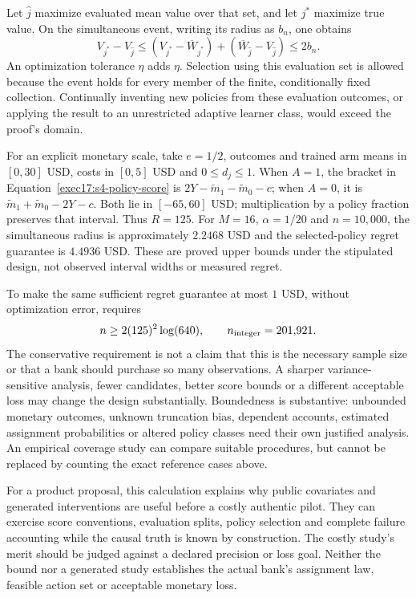 Let $\widehat j$ maximize evaluated mean value over that set, and let
$j^*$ maximize true value. On the simultaneous event, writing its radius
as $b_n$, one obtains
\[
 V_{j^*}-V_{\widehat j}
 \leq (V_{j^*}-\overline W_{j^*})
      +(\overline W_{\widehat j}-V_{\widehat j})\leq2b_n.
\]
An optimization tolerance $\eta$ adds $\eta$. Selection using this evaluation
set is allowed because the event holds for every member of the finite,
conditionally fixed collection. Continually inventing new policies from
these evaluation outcomes, or applying the result to an unrestricted
adaptive learner class, would exceed the proof's domain.

For an explicit monetary scale, take $e=1/2$, outcomes and trained arm
means in $[0,30]$ USD, costs in $[0,5]$ USD and $0\leq d_j\leq1$.
When $A=1$, the bracket in Equation~\eqref{exec17:s4-policy-score} is
$2Y-\widetilde m_1-\widetilde m_0-c$; when $A=0$, it is
$\widetilde m_1+\widetilde m_0-2Y-c$. Both lie in $[-65,60]$ USD;
multiplication by a policy fraction preserves that interval. Thus $R=125$.
For $M=16$, $\alpha=1/20$ and $n=10{,}000$, the simultaneous radius is
approximately $2.2468$ USD and the selected-policy regret guarantee is
$4.4936$ USD. These are proved upper bounds under the stipulated design,
not observed interval widths or measured regret.

To make the same sufficient regret guarantee at most $1$ USD, without
optimization error, requires
\begin{equation}
 n\geq 2(125)^2\log(640),\qquad n_{\rm integer}=201{,}921.
 \label{exec17:s4-evaluation-size}
\end{equation}
The conservative requirement is not a claim that this is the necessary
sample size or that a bank should purchase so many observations. A sharper
variance-sensitive analysis, fewer candidates, better score bounds or a
different acceptable loss may change the design substantially. Boundedness
is substantive: unbounded monetary outcomes, unknown truncation bias,
dependent accounts, estimated assignment probabilities or altered policy
classes need their own justified analysis. An empirical coverage study can
compare suitable procedures, but cannot be replaced by counting the exact
reference cases above.

For a product proposal, this calculation explains why public covariates and
generated interventions are useful before a costly authentic pilot. They can
exercise score conventions, evaluation splits, policy selection and complete
failure accounting while the causal truth is known by construction. The
costly study's merit should be judged against a declared precision or loss
goal. Neither the bound nor a generated study establishes the actual bank's
assignment law, feasible action set or acceptable monetary loss.

